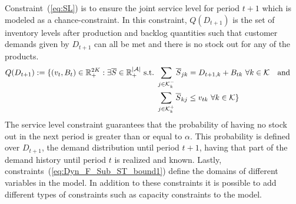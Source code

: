 \documentclass[10pt]{article}
\newcommand{\ti}{t} %
\newcommand{\ka}{k} %
\newcommand{\KA}{\mathcal{K}}
\newcommand{\Ka}{K}
\newcommand{\jey}{j} %
\newcommand{\Graf}{\mathcal{A}} %
\newcommand{\Bi}{B} %
\newcommand{\Vi}{v} %
\newcommand{\Es}{S} %
\newcommand{\Csub}{\mathcal{K}^+_k}
\newcommand{\Psub}{\mathcal{K}^-_k}
\begin{document}
Constraint~(\ref{eq:SL}) is to ensure the joint service level for period $\ti+1$ which is modeled as a chance-constraint. In this constraint, $Q(D_ {\ti+1})$ is the set of inventory levels after production and backlog quantities such that customer demands given by $D_{\ti+1}$ can all be met and there is no stock out for any of the products.
\begin{align} Q(D_ {\ti +1}) := \{ (v_{\ti},B_{\ti}) \in \mathbb{R}_{+}^{2\Ka} :  \exists \overline{\Es} \in \mathbb{R}_{+}^{|\Graf|} \ \text{s.t.} \ 
 & \sum_{\jey \in  \Psub} \overline{\Es}_{\jey \ka } = D_{\ti+1,\ka} + \Bi_{\ti\ka} \ \forall \ka  \in \KA  \quad \text{and }\notag \\
 & \sum_{\jey \in  \Csub} \overline{\Es}_{\ka \jey} \leq \Vi_{\ti\ka} \ \forall \ka  \in \KA \} & \label{eq:SetQ}
 \end{align}
  The service level constraint guarantees that the probability of having no stock out in the next period is greater than or equal to $\alpha$. 
 This probability is defined over $D_{\ti+1}$, the demand distribution until period $\ti+1$, having that part of the demand history until period $\ti$ is realized and known. Lastly, constraints~(\ref{eq:Dyn_F_Sub_ST_bound1}) define the domains of different variables in the model.
In addition to these constraints it is possible to add different types of constraints such as capacity constraints to the model.
\end{document}
